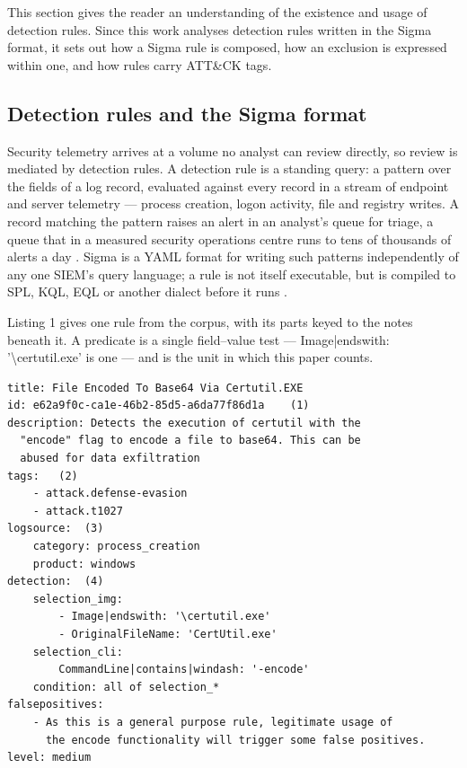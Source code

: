 This section gives the reader an understanding of the existence and usage of detection rules. Since this work analyses detection rules written in the Sigma format, it sets out how a Sigma rule is composed, how an exclusion is expressed within one, and how rules carry ATT\&CK tags.

\subsection{Detection rules and the Sigma format}

Security telemetry arrives at a volume no analyst can review directly, so review is mediated by detection rules. A detection rule is a standing query: a pattern over the fields of a log record, evaluated against every record in a stream of endpoint and server telemetry --- process creation, logon activity, file and registry writes. A record matching the pattern raises an alert in an analyst's queue for triage, a queue that in a measured security operations centre runs to tens of thousands of alerts a day \citep{yang2024}. Sigma is a YAML format for writing such patterns independently of any one SIEM's query language; a rule is not itself executable, but is compiled to SPL, KQL, EQL or another dialect before it runs \citep{sigmahq2024}.

Listing 1 gives one rule from the corpus, with its parts keyed to the notes beneath it. A predicate is a single field--value test --- Image|endswith: '\textbackslash{}certutil.exe' is one --- and is the unit in which this paper counts.

\begin{listing}[htbp]
\caption{Rule proc\_creation\_win\_certutil\_encode.yml (UUID e62a9f0c-ca1e-46b2-85d5-a6da77f86d1a) at the snapshot. The tags, logsource and detection blocks are verbatim; metadata fields (status, references, author, date, modified) are omitted and two descriptive strings truncated. Callouts are keyed below.}
\label{listing:1}
\begin{lstlisting}
title: File Encoded To Base64 Via Certutil.EXE
id: e62a9f0c-ca1e-46b2-85d5-a6da77f86d1a	(1)
description: Detects the execution of certutil with the
  "encode" flag to encode a file to base64. This can be
  abused for data exfiltration
tags:	(2)
    - attack.defense-evasion
    - attack.t1027
logsource:	(3)
    category: process_creation
    product: windows
detection:	(4)
    selection_img:
        - Image|endswith: '\certutil.exe'
        - OriginalFileName: 'CertUtil.exe'
    selection_cli:
        CommandLine|contains|windash: '-encode'
    condition: all of selection_*
falsepositives:
    - As this is a general purpose rule, legitimate usage of
      the encode functionality will trigger some false positives.
level: medium
\end{lstlisting}
\end{listing}

